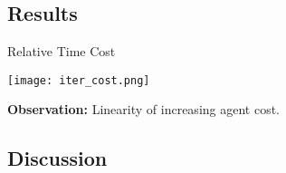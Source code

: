 
\subsection{Results}

\begin{frame}{Relative Time Cost}
    \begin{center}
        \texttt{[image: iter\_cost.png]}
    \end{center}
    \textbf{Observation:} Linearity of increasing agent cost.
\end{frame}






\subsection{Discussion}

